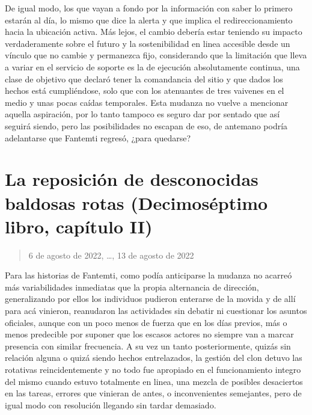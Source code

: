 \documentclass[
]{book}
\begin{document}
De igual modo, los que vayan a fondo por la información con saber lo primero estarán al día, lo mismo que dice la alerta y que implica el redireccionamiento hacia la ubicación activa. Más lejos, el cambio debería estar teniendo su impacto verdaderamente sobre el futuro y la sostenibilidad en linea accesible desde un vínculo que no cambie y permanezca fijo, considerando que la limitación que lleva a variar en el servicio de soporte es la de ejecución absolutamente continua, una clase de objetivo que declaró tener la comandancia del sitio y que dados los hechos está cumpliéndose, solo que con los atenuantes de tres vaivenes en el medio y unas pocas caídas temporales. Esta mudanza no vuelve a mencionar aquella aspiración, por lo tanto tampoco es seguro dar por sentado que así seguirá siendo, pero las posibilidades no escapan de eso, de antemano podría adelantarse que Fantemti regresó, ¿para quedarse?

\hypertarget{la-reposiciuxf3n-de-desconocidas-baldosas-rotas-decimosuxe9ptimo-libro-capuxedtulo-ii}{%
\section{La reposición de desconocidas baldosas rotas (Decimoséptimo libro, capítulo II)}\label{la-reposiciuxf3n-de-desconocidas-baldosas-rotas-decimosuxe9ptimo-libro-capuxedtulo-ii}}

\begin{quote}
6 de agosto de 2022, \ldots, 13 de agosto de 2022
\end{quote}

Para las historias de Fantemti, como podía anticiparse la mudanza no acarreó más variabilidades inmediatas que la propia alternancia de dirección, generalizando por ellos los individuos pudieron enterarse de la movida y de allí para acá vinieron, reanudaron las actividades sin debatir ni cuestionar los asuntos oficiales, aunque con un poco menos de fuerza que en los días previos, más o menos predecible por suponer que los escasos actores no siempre van a marcar presencia con similar frecuencia. A su vez un tanto posteriormente, quizás sin relación alguna o quizá siendo hechos entrelazados, la gestión del clon detuvo las rotativas reincidentemente y no todo fue apropiado en el funcionamiento integro del mismo cuando estuvo totalmente en linea, una mezcla de posibles desaciertos en las tareas, errores que vinieran de antes, o inconvenientes semejantes, pero de igual modo con resolución llegando sin tardar demasiado.
\end{document}
